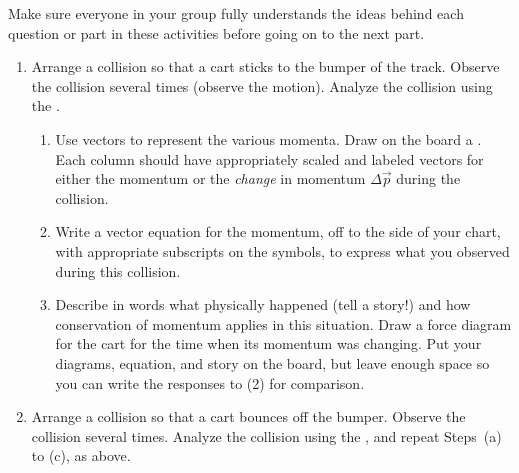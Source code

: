 \noindent Make sure everyone in your group fully understands the ideas behind each question or part in these activities before going on to the next part.
\begin{enumerate}
	\item \label{711,1} Arrange a collision so that a cart sticks to the bumper of the track. Observe the collision several times (observe the motion). Analyze the collision using the \pConsModel{}.
	\begin{enumerate}
		\item Use vectors to represent the various momenta. Draw on the board a \pchart{}. Each column should have appropriately scaled and labeled vectors for either the momentum or the \emph{change} in momentum $\Delta \vec{p}$ during the collision.
		
		\item Write a vector equation for the momentum, off to the side of your chart, with appropriate subscripts on the symbols, to express what you observed during this collision.
		
		\item Describe in words what physically happened (tell a story!) and how conservation of momentum applies in this situation. Draw a force diagram for the cart for the time when its momentum was changing. Put your diagrams, equation, and story on the board, but leave enough space so you can write the responses to (2) for comparison.
	\end{enumerate}
	
	\item Arrange a collision so that a cart bounces off the bumper. Observe the collision several times. Analyze the collision using the \pConsModel{}, and repeat Steps~(a) to (c), as above.
\end{enumerate}
